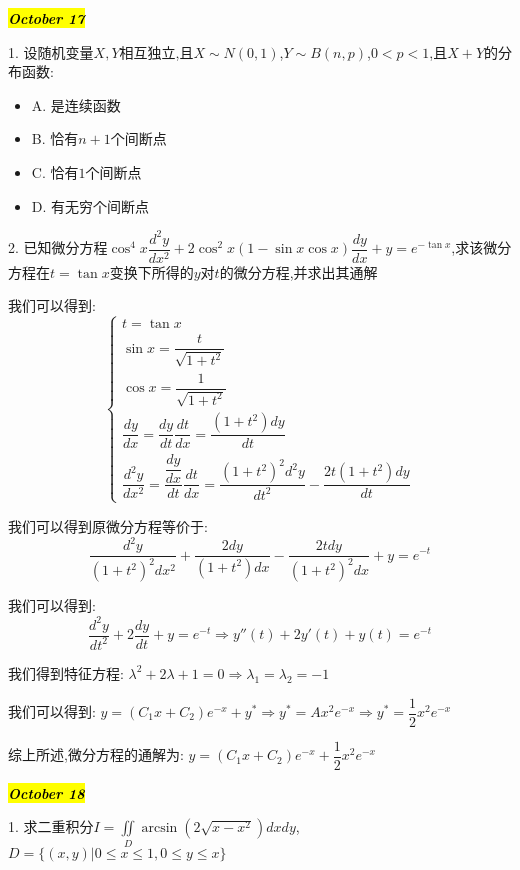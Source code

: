 \hl{\textbf{\textit{October 17}}}

1. 设随机变量$X,Y$相互独立,且$X\sim N(0,1)$,$Y\sim B(n,p)$,$0<p<1$,且$X+Y$的分布函数:  
\begin{itemize}
	\item A. 是连续函数
	\item B. 恰有$n+1$个间断点
	\item C. 恰有$1$个间断点
	\item D. 有无穷个间断点
\end{itemize}
\begin{solution}
	
\end{solution}

2. 已知微分方程$\cos^4 x\dfrac{d^2y}{dx^2}+2\cos^2 x(1-\sin x\cos x)\dfrac{dy}{dx}+y=e^{-\tan x}$,求该微分方程在$t=\tan x$变换下所得的$y$对$t$的微分方程,并求出其通解

\begin{solution}

	我们可以得到:  $$\left\lbrace
	\begin{array}{l}
		t=\tan x\\
		\sin x=\dfrac{t}{\sqrt{1+t^2}}\\
		\cos x=\dfrac{1}{\sqrt{1+t^2}}\\
		\dfrac{dy}{dx}=\dfrac{dy}{dt}\dfrac{dt}{dx}=\dfrac{(1+t^2)dy}{dt}\\
		\dfrac{d^2y}{dx^2}=\dfrac{\dfrac{dy}{dx}}{dt}\dfrac{dt}{dx}=\dfrac{(1+t^2)^2d^2y}{dt^2}-\dfrac{2t(1+t^2)dy}{dt}
	\end{array}
	\right. $$
	
	我们可以得到原微分方程等价于:  
	$$\dfrac{d^2y}{(1+t^2)^2dx^2}+\dfrac{2dy}{(1+t^2)dx}-\dfrac{2tdy}{(1+t^2)^2dx}+y=e^{-t}$$
	
	我们可以得到:  
	$$\dfrac{d^2y}{dt^2}+2\dfrac{dy}{dt}+y=e^{-t}\Rightarrow y''(t)+2y'(t)+y(t)=e^{-t}$$
	
	我们得到特征方程:  $\lambda^2+2\lambda+1=0\Rightarrow \lambda_{1}=\lambda_{2}=-1$
	
	我们可以得到:  $y=(C_{1}x+C_{2})e^{-x}+y^{*}\Rightarrow y^{*}=Ax^2e^{-x}\Rightarrow y^{*}=\dfrac{1}{2}x^2e^{-x}$
	
	综上所述,微分方程的通解为:  $y=(C_{1}x+C_{2})e^{-x}+\dfrac{1}{2}x^2e^{-x}$
\end{solution}

\hl{\textbf{\textit{October 18}}}

1. 求二重积分$I=\iint\limits_{D}\arcsin(2\sqrt{x-x^2})dxdy$,$D=\{(x,y)|0\leq x\leq 1,0\leq y\leq x\}$

